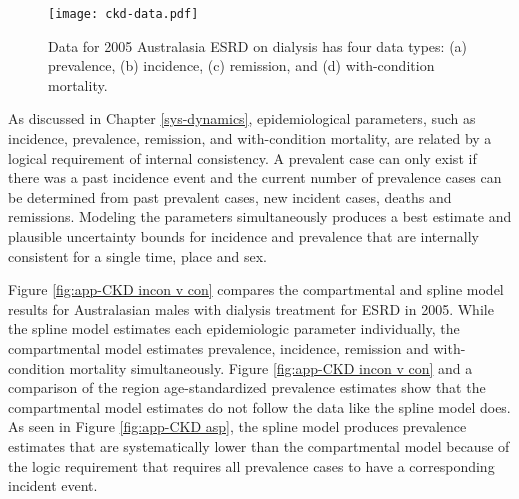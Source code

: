 
    \begin{figure}[h]
        \begin{center}
            \texttt{[image: ckd-data.pdf]}
            \caption{Data for 2005 Australasia ESRD on dialysis has four
              data types: (a) prevalence, (b) incidence, (c)
              remission, and (d) with-condition mortality.}
            \label{fig:app-CKD data}
        \end{center}
    \end{figure}

As discussed in Chapter \ref{sys-dynamics}, epidemiological parameters,
such as incidence, prevalence, remission, and with-condition
mortality, are related by a logical requirement of internal
consistency.  A prevalent case can only exist if there was a past
incidence event and the current number of prevalence cases can be
determined from past prevalent cases, new incident cases, deaths and
remissions.  Modeling the parameters simultaneously produces a best
estimate and plausible uncertainty bounds for incidence and prevalence
that are internally consistent for a single time, place and sex.

Figure \ref{fig:app-CKD incon v con} compares the compartmental and
spline model results for Australasian males with dialysis
treatment for ESRD in 2005.  While the spline model estimates each
epidemiologic parameter individually, the compartmental model estimates
prevalence, incidence, remission and with-condition mortality
simultaneously.  Figure \ref{fig:app-CKD incon v con} and a
comparison of the region age-standardized prevalence estimates
show that the compartmental model estimates do not follow the data
like the spline model does.  As seen in Figure \ref{fig:app-CKD asp}, the
spline model produces prevalence estimates that are systematically lower
than the compartmental model because of the logic requirement that
requires all prevalence cases to have a corresponding incident event.

